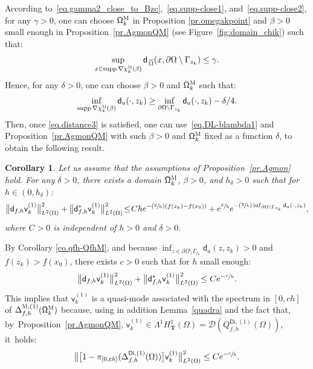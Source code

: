 \documentclass[JEP,XML,SOM,Unicode,NoEqCountersInSection,NoFloatCountersInSection,published]{cedram}
\newcommand{\Psfrac}[2]{(\sfrac{#1}{#2})}
\newcommand{\mbf}[1]{\mathbf{#1}}
\DeclareMathOperator\supp{supp}
\theoremstyle{plain}
\newtheorem{corollary}[proposition]{Corollary}
\theoremstyle{definition}
\begin{document}
According to~\eqref{eq.gamma2_close_to_Bzc},~\eqref{eq.supp-close1},
and~\eqref{eq.supp-close2}, for any $\gamma>0$, one can choose
$\mathsf \Omega_k^{\textsc{M}}$ in Proposition \ref{pr.omegakpoint} and
$\beta >0$ small enough in Proposition~\ref{pr.AgmonQM} (see Figure~\ref{fig:domain_chik}) such that:
\[
\sup_{x\in \supp \nabla \chi_k^{\textsc{M}} (\beta)}\mathsf d_{\, \overline \Omega}(x, \partial \Omega \setminus \Gamma_{z_k})\le \gamma.
\]
Hence, for any $\delta>0$, one can choose $\beta >0$ and $\mathsf \Omega_k^{\textsc{M}}$ such that:
\begin{equation}\label{eq.distance3}
\inf_{ \supp \nabla \chi_k^{\textsc{M}} (\beta)} \mathsf d_a(\cdot,z_k)\ge \inf_{ \partial \Omega \setminus \Gamma_{z_k}} \mathsf d_a(\cdot,z_k)-\delta/4.
\end{equation}
Then, once \eqref{eq.distance3} is satisfied, one can
use~\eqref{eq.DL-blambda1} and Proposition~\ref{pr.AgmonQM} with such
$\beta>0$ and $\mathsf \Omega_k^{\textsc{M}}$ fixed as a function $\delta$, to obtain the following result.

\begin{corollary}\label{co.AgmonQM}
\label{co.qfh-QfhM}
Let us assume that the assumptions of Proposition~\ref{pr.Agmon} hold.
For any $\delta>0$,
there exists a domain $\mathsf \Omega_k^{\textsc{M}}$, $\beta>0$, and $h_\delta>0$ such that for $h\in (0,h_\delta)$:
\[
\big \| \mathsf d_{f,h} \mathsf v_k^{(1)} \big \|^{2}_{ L^{2} (\Omega)}+
\big \| \mathsf d^{*}_{f,h} \mathsf v_k^{(1)} \big \|^{2}_{ L^{2} (\Omega)}\!\le\! Ch e^{-\Psfrac 2h(f(z_k)-f(x_0))}+ e^{\sfrac{ \delta}{h}}e^{-\Psfrac 2h \inf_{ \partial \Omega \setminus \Gamma_{z_k}} \mathsf d_a(\cdot,z_k)},
\]
where $C>0$ is independent of $h>0$ and $\delta>0$.\end{corollary}

By Corollary \ref{co.qfh-QfhM}, and because $\inf_{z\in \partial \Omega \setminus \Gamma_{z_k}} \mathsf d_a(z,z_k)>0$ and $f(z_k)>f(x_0)$, there exists $c>0$ such that for $h$ small enough:
\[
\big \| \mathsf d_{f,h} \mathsf v_k^{(1)} \big \|^{2}_{ L^{2} (\Omega)}+
\big \| \mathsf d^{*}_{f,h} \mathsf v_k^{(1)} \big \|^{2}_{ L^{2} (\Omega)}\le C e^{-\sfrac ch}.
\]
This implies that $ \mathsf v_k^{(1)} $ is a quasi-mode
associated with the spectrum in $[0,ch]$ of
$\Delta_{f,h}^{\textsc{M},(1)} (\mathsf \Omega_k^{\textsc{M}})$
because, using in addition Lemma~\ref{quadra} and the fact that, by~Proposition~\ref{pr.AgmonQM}, $\mathsf v_k^{(1)}\in \Lambda^1H^1_{\mbf T}(\Omega)=\mathcal D(Q_{f,h}^{\mathsf{Di},(1)} (\Omega))$, it~holds:
\begin{equation}\label{eq.QM-est-expo-petit}
\bigl \Vert \big [1-\pi_{[0,\mathsf ch]} (\Delta_{f,h}^{\mathsf{Di},(1)} (\Omega))\big] \mathsf v_k^{(1)} \bigr \|^{2}_{ L^{2} (\Omega)} \le C e^{-\sfrac ch}.
\end{equation}
\end{document}
